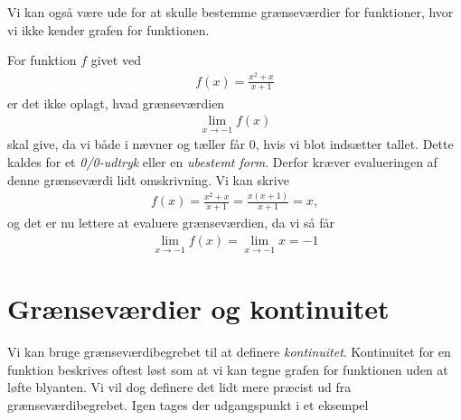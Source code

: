 Vi kan også være ude for at skulle bestemme grænseværdier for funktioner, hvor vi ikke kender grafen for funktionen. 
\begin{exa}
	For funktion $f$ givet ved
	\begin{align*}
		f(x) = \frac{x^2 + x}{x + 1}
	\end{align*}
	er det ikke oplagt, hvad grænseværdien
	\begin{align*}
		\lim_{x \to -1}f(x)
	\end{align*}
	skal give, da vi både i nævner og tæller får $0$, hvis vi blot indsætter tallet. 
	Dette kaldes for et \textit{0/0-udtryk} eller en \textit{ubestemt form}. Derfor kræver evalueringen
	af denne grænseværdi lidt omskrivning. Vi kan skrive
	\begin{align*}
		f(x) = \frac{x^2 + x}{x + 1} = \frac{x(x+1)}{x+1} = x,
	\end{align*}
	og det er nu lettere at evaluere grænseværdien, da vi så får
	\begin{align*}
		\lim_{x \to -1}f(x) =\lim_{x \to -1}x = -1
	\end{align*}
\end{exa}

\newpage
\section*{Grænseværdier og kontinuitet}

Vi kan bruge grænseværdibegrebet til at definere \textit{kontinuitet}. Kontinuitet for en funktion beskrives oftest løst som at vi kan tegne grafen for funktionen uden at løfte blyanten. Vi vil dog definere det lidt mere præcist ud fra grænseværdibegrebet. Igen tages der udgangspunkt i et eksempel

